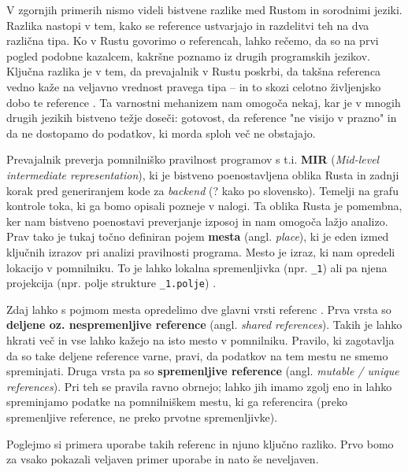 \documentclass[a4paper,12pt,openright]{book}
\newcommand{\angl}[1]{(angl. \textit{#1})}
\begin{document}
V zgornjih primerih nismo videli bistvene razlike med Rustom in sorodnimi jeziki. Razlika nastopi v tem, kako se reference ustvarjajo in razdelitvi teh na dva različna tipa. Ko v Rustu govorimo o referencah, lahko rečemo, da so na prvi pogled podobne kazalcem, kakršne poznamo iz drugih programskih jezikov. Ključna razlika je v tem, da prevajalnik v Rustu poskrbi, da takšna referenca vedno kaže na veljavno vrednost pravega tipa -- in to skozi celotno življenjsko dobo te reference \cite{klabnikRustProgrammingLanguage2023}. Ta varnostni mehanizem nam omogoča nekaj, kar je v mnogih drugih jezikih bistveno težje doseči: gotovost, da reference "ne visijo v prazno" in da ne dostopamo do podatkov, ki morda sploh več ne obstajajo.

Prevajalnik preverja pomnilniško pravilnost programov s t.i. \textbf{MIR} (\textit{Mid-level intermediate representation}), ki je bistveno poenostavljena oblika Rusta in zadnji korak pred generiranjem kode za \textit{backend} (? kako po slovensko). Temelji na grafu kontrole toka, ki ga bomo opisali pozneje v nalogi. Ta oblika Rusta je pomembna, ker nam bistveno poenostavi preverjanje izposoj in nam omogoča lažjo analizo. Prav tako je tukaj točno definiran pojem \textbf{mesta} \angl{place}, ki je eden izmed ključnih izrazov pri analizi pravilnosti programa. Mesto je izraz, ki nam opredeli lokacijo v pomnilniku. To je lahko lokalna spremenljivka (npr. \verb|_1|) ali pa njena projekcija (npr. polje strukture \verb|_1.polje|) \cite{MIRMidlevelIR}.

Zdaj lahko s pojmom mesta opredelimo dve glavni vrsti referenc \cite{crichtonGroundedConceptualModel2023,yanovskiGhostCellSeparatingPermissions2021,weissOxideEssenceRust2019}. Prva vrsta so \textbf{deljene oz. nespremenljive reference} \angl{shared references}. Takih je lahko hkrati več in vse lahko kažejo na isto mesto v pomnilniku. Pravilo, ki zagotavlja da so take deljene reference varne, pravi, da podatkov na tem mestu ne smemo spreminjati. Druga vrsta pa so \textbf{spremenljive reference} \angl{mutable / unique references}. Pri teh se pravila ravno obrnejo; lahko jih imamo zgolj eno in lahko spreminjamo podatke na pomnilniškem mestu, ki ga referencira (preko spremenljive reference, ne preko prvotne spremenljivke).

Poglejmo si primera uporabe takih referenc in njuno ključno razliko. Prvo bomo za vsako pokazali veljaven primer uporabe in nato še neveljaven.
\end{document}
